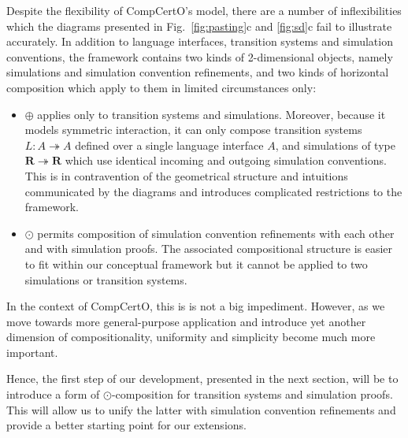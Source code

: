\documentclass[acmsmall,screen,review,anonymous]{acmart}
\begin{document}
Despite the flexibility of CompCertO's model,
there are a number of inflexibilities which
the diagrams presented in Fig.~\ref{fig:pasting}c and \ref{fig:sd}c
fail to illustrate accurately.
In addition to language interfaces,
transition systems and simulation conventions,
the framework contains two kinds of 2-dimensional objects,
namely simulations and simulation convention refinements,
and two kinds of horizontal composition which apply to them
in limited circumstances only:
\begin{itemize}
  \item $\oplus$ applies only to transition systems and simulations.
    Moreover, because it models symmetric interaction,
    it can only compose transition systems $L : A \twoheadrightarrow A$
    defined over a single language interface $A$,
    and simulations of type $\mathbf{R} \twoheadrightarrow \mathbf{R}$
    which use identical incoming and outgoing simulation conventions.
    This is in contravention of the geometrical structure and intuitions
    communicated by the diagrams and introduces complicated restrictions
    to the framework.
  \item $\odot$ permits composition of simulation convention refinements
    with each other and with simulation proofs.
    The associated compositional structure is easier to fit
    within our conceptual framework
    but it cannot be applied to two simulations or transition systems.
\end{itemize}
In the context of CompCertO,
this is is not a big impediment.
However,
as we move towards more general-purpose application
and introduce yet another dimension of compositionality,
uniformity and simplicity become much more important.

Hence,
the first step of our development,
presented in the next section,
will be to introduce a form of $\odot$-composition
for transition systems and simulation proofs.
This will allow us to unify the latter with simulation convention refinements
and provide a better starting point for our extensions.


\end{document}
